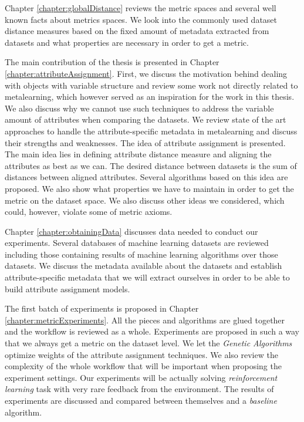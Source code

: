 Chapter \ref{chapter:globalDistance} reviews the metric spaces and several well known facts about metrics spaces. We look into the commonly used dataset distance measures based on the fixed amount of metadata extracted from datasets and what properties are necessary in order to get a metric.

The main contribution of the thesis is presented in Chapter \ref{chapter:attributeAssignment}. First, we discuss the motivation behind dealing with objects with variable structure and review some work not directly related to metalearning, which however served as an inspiration for the work in this thesis. We also discuss why we cannot use such techniques to address the variable amount of attributes when comparing the datasets. We review state of the art approaches to handle the attribute-specific metadata in metalearning and discuss their strengths and weaknesses. The idea of attribute assignment is presented. The main idea lies in defining attribute distance measure and aligning the attributes as best as we can. The desired distance between datasets is the sum of distances between aligned attributes. Several algorithms based on this idea are proposed. We also show what properties we have to maintain in order to get the metric on the dataset space. We also discuss other ideas we considered, which could, however, violate some of metric axioms.

Chapter \ref{chapter:obtainingData} discusses data needed to conduct our experiments. Several databases of machine learning datasets are reviewed including those containing results of machine learning algorithms over those datasets. We discuss the metadata available about the datasets and establish attribute-specific metadata that we will extract ourselves in order to be able to build attribute assignment models.

The first batch of experiments is proposed in Chapter \ref{chapter:metricExperiments}. All the pieces and algorithms are glued together and the workflow is reviewed as a whole. Experiments are proposed in such a way that we always get a metric on the dataset level. We let the \emph{Genetic Algorithms} \cite{HollandGeneticAlgorithms} optimize weights of the attribute assignment techniques. We also review the complexity of the whole workflow that will be important when proposing the experiment settings. Our experiments will be actually solving \emph{reinforcement learning} \cite{aima3ed} task with very rare feedback from the environment. The results of experiments are discussed and compared between themselves and a \emph{baseline} algorithm. 

